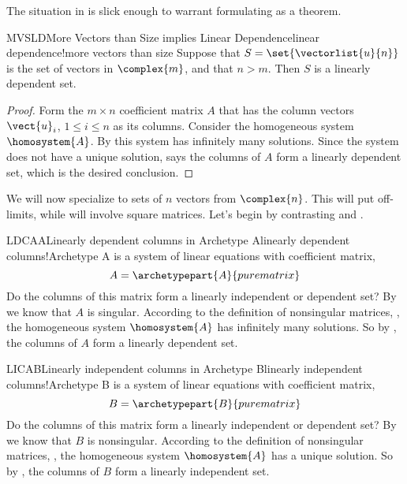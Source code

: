 %
The situation in  is slick enough to warrant formulating as a theorem.
%
\begin{theorem}{MVSLD}{More Vectors than Size implies Linear Dependence}{linear dependence!more vectors than size}
Suppose that $S=\set{\vectorlist{u}{n}}$ is the set of vectors in $\complex{m}$, and that $n>m$.   Then $S$ is a linearly dependent set.
\end{theorem}
%
\begin{proof}
Form the $m\times n$ coefficient matrix $A$ that has the column vectors $\vect{u}_i$, $1\leq i\leq n$ as its columns.  Consider the homogeneous system $\homosystem{A}$.  By  this system has infinitely many solutions.  Since the system does not have a unique solution,  says the columns of $A$ form a linearly dependent set, which is the desired conclusion.
\end{proof}
%
%
We will now specialize to sets of $n$ vectors from $\complex{n}$.  This will put  off-limits, while  will involve square matrices.  Let's begin by contrasting  and .
%
\begin{example}{LDCAA}{Linearly dependent columns in Archetype A}{linearly dependent columns!Archetype A}
 is a system of linear equations with coefficient matrix,
%
\begin{equation*}
A=
\archetypepart{A}{purematrix}
\end{equation*}
%
Do the columns of this matrix form a linearly independent or dependent set?  By  we know that $A$ is singular.  According to the definition of nonsingular matrices, , the homogeneous system $\homosystem{A}$ has infinitely many solutions.  So by , the columns of $A$ form a linearly dependent set.
%
\end{example}
%
\begin{example}{LICAB}{Linearly independent columns in Archetype B}{linearly independent columns!Archetype B}
 is a system of linear equations with coefficient matrix,
%
\begin{equation*}
B=
\archetypepart{B}{purematrix}
\end{equation*}
%
Do the columns of this matrix form a linearly independent or dependent set?  By  we know that $B$ is nonsingular.  According to the definition of nonsingular matrices, , the homogeneous system $\homosystem{A}$ has a unique solution.  So by , the columns of $B$ form a linearly independent set.
%
\end{example}
